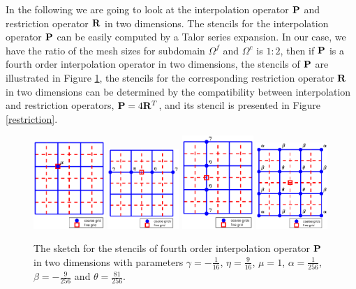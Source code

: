 In the following we are going to look at the interpolation operator ${\bf P}$ and restriction operator ${\bf R}$ in two dimensions. The stencils for the interpolation operator ${\bf P}$ can be easily computed by a Talor series expansion. In our case, we have the ratio of the mesh sizes for subdomain $\Omega^f$ and $\Omega^c$ is $1:2$, then if  ${\bf P}$ is a fourth order interpolation operator in two dimensions,  the stencils of ${\bf P}$ are illustrated in  Figure \ref{interpolation}, the stencils for the corresponding restriction operator $\bf R$ in two dimensions can be determined by the compatibility between interpolation and restriction operators, ${\bf P} = 4{\bf R}^T$, and its stencil is presented in Figure \ref{restriction}.
\begin{figure}[htbp]
	\centering
	\includegraphics[width=0.24\textwidth,trim={1.8cm 0.8cm 1.4cm 1.2cm}, clip]{interpolation1.eps}
	\includegraphics[width=0.24\textwidth,trim={1.8cm 0.8cm 1.4cm 1.2cm}, clip]{interpolation2.eps}
	\includegraphics[width=0.24\textwidth,trim={1.8cm 0.8cm 1.4cm 1.2cm}, clip]{interpolation3.eps}
	\includegraphics[width=0.24\textwidth,trim={1.8cm 0.8cm 1.4cm 1.2cm}, clip]{interpolation4.eps}
	\caption{The sketch for the stencils of fourth order interpolation operator ${\bf P}$ in two dimensions with parameters $\gamma = -\frac{1}{16}$, $\eta = \frac{9}{16}$, $\mu = 1$, $\alpha = \frac{1}{256}$, $\beta = -\frac{9}{256}$ and $\theta = \frac{81}{256}$. }\label{interpolation}
\end{figure}
